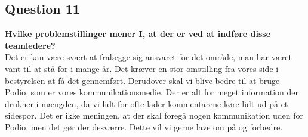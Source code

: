 \subsection{Question 11}
\label{i2q11}
\noindent \textbf{Hvilke problemstillinger mener I, at der er ved at indføre disse teamledere?} \\
Det er kan være svært at fralægge sig ansvaret for det område, man har været vant til at stå for i mange år. Det kræver en stor omstilling fra vores side i bestyrelsen at få det gennemført. Derudover skal vi blive bedre til at bruge Podio, som er vores kommunikationsmedie. Der er alt for meget information der drukner i mængden, da vi lidt for ofte lader kommentarene køre lidt ud på et sidespor. Det er ikke meningen, at der skal foregå nogen kommunikation uden for Podio, men det gør der desværre. Dette vil vi gerne lave om på og forbedre.